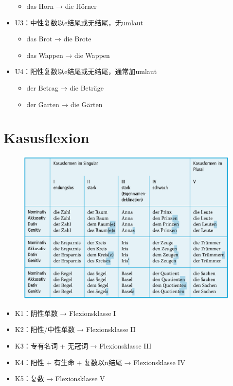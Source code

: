 \documentclass[UTF8]{report}
\begin{document}
\begin{itemize}
\begin{itemize}
        \item das Horn → die Hörner
    \end{itemize}
    \item U3：中性复数以e结尾或无结尾，无umlaut
    \begin{itemize}
        \item das Brot → die Brote
        \item das Wappen → die Wappen
    \end{itemize}
    \item U4：阳性复数以e结尾或无结尾，通常加umlaut
    \begin{itemize}
        \item der Betrag → die Beträge
        \item der Garten → die Gärten
    \end{itemize}
\end{itemize}

\section{Kasusflexion}
\begin{figure}[H]
    \centering
    \includegraphics[scale=0.6]{kasus.png}
\end{figure}

\begin{itemize}
    \item K1：阴性单数 → Flexionsklasse I 
    \item K2：阳性/中性单数 → Flexionsklasse II
    \item K3：专有名词 + 无冠词 → Flexionsklasse III
    \item K4：阳性 + 有生命 + 复数以n结尾 → Flexionsklasse IV
    \item K5：复数 → Flexionsklasse V
\end{itemize}
\end{document}
